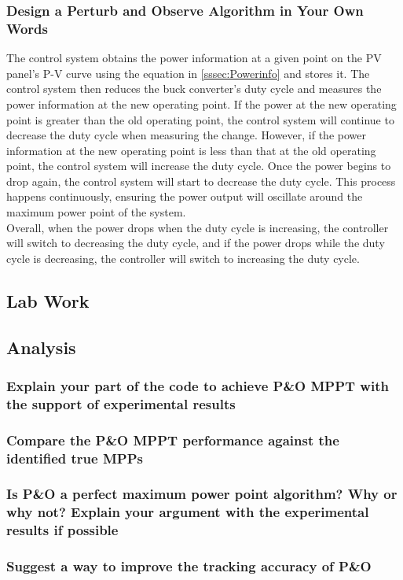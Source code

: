 \documentclass[]{article}
\begin{document}
	    	
	   	    \subsubsection{Design a Perturb and Observe Algorithm in Your Own Words}
	   	        The control system obtains the power information at a given point on the PV panel's P-V curve using the equation in \cref{sssec:Powerinfo} and stores it. The control system then reduces the buck converter's duty cycle and measures the power information at the new operating point. If the power at the new operating point is greater than the old operating point, the control system will continue to decrease the duty cycle when measuring the change. However, if the power information at the new operating point is less than that at the old operating point, the control system will increase the duty cycle. Once the power begins to drop again, the control system will start to decrease the duty cycle. This process happens continuously, ensuring the power output will oscillate around the maximum power point of the system.\\
	   	        
	   	        Overall, when the power drops when the duty cycle is increasing, the controller will switch to decreasing the duty cycle, and if the power drops while the duty cycle is decreasing, the controller will switch to increasing the duty cycle.
       
       \subsection{Lab Work}
   	    
   		\subsection{Analysis}
   			\subsubsection{Explain your part of the code to achieve P\&O MPPT with the support of experimental results}
   			\subsubsection{Compare the P\&O MPPT performance against the identified true MPPs}
   			\subsubsection{Is P\&O a perfect maximum power point algorithm? Why or why not? Explain your argument with the experimental results if possible}
   			\subsubsection{Suggest a way to improve the tracking accuracy of P\&O}
\end{document}
